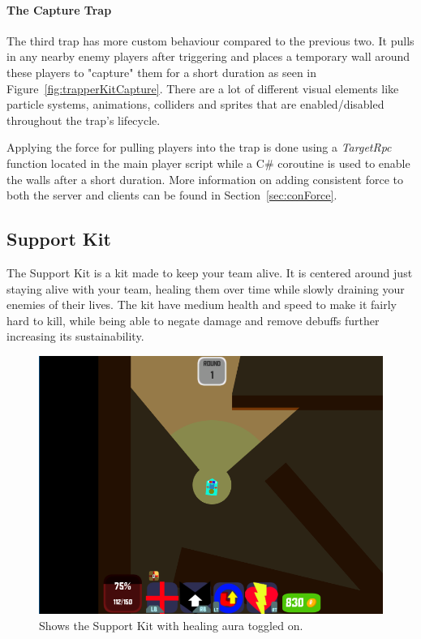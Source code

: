 \paragraph{The Capture Trap}
The third trap has more custom behaviour compared to the previous two. It pulls in any nearby enemy players after triggering and places a temporary wall around these players to "capture" them for a short duration as seen in Figure~\ref{fig:trapperKitCapture}. There are a lot of different visual elements like particle systems, animations, colliders and sprites that are enabled/disabled throughout the trap's lifecycle. 

Applying the force for pulling players into the trap is done using a \emph{TargetRpc} function located in the main player script while a C\# coroutine is used to enable the walls after a short duration. More information on adding consistent force to both the server and clients can be found in Section~\ref{sec:conForce}. 

\subsection{Support Kit}
The Support Kit is a kit made to keep your team alive. It is centered around just staying alive with your team, healing them over time while slowly draining your enemies of their lives. The kit have medium health and speed to make it fairly hard to kill, while being able to negate damage and remove debuffs further increasing its sustainability.

\begin{figure}[tbph]  %
  \centering
  \includegraphics[width=\textwidth]{images/SupportKitHealing}
  \caption[Screenshot of the Support Kit]{Shows the Support Kit with healing aura toggled on.}
  \label{fig:supportKit}
\end{figure}

